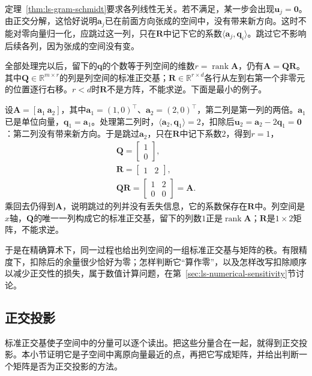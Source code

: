 定理~\ref{thm:ls-gram-schmidt}要求各列线性无关。若不满足，某一步会出现$\bm u_j=\bm0$。由正交分解，这恰好说明$\bm a_j$已在前面方向张成的空间中，没有带来新方向。这时不能对零向量归一化，应跳过这一列，只在$\bm R$中记下它的系数$\langle\bm a_j,\bm q_i\rangle$。跳过它不影响后续各列，因为张成的空间没有变。

全部处理完以后，留下的$\bm q$的个数等于列空间的维数$r=\operatorname{rank}\bm A$，仍有$\bm A=\bm Q\bm R$。其中$\bm Q\in\mathbb R^{m\times r}$的列是列空间的标准正交基；$\bm R\in\mathbb R^{r\times d}$各行从左到右第一个非零元的位置逐行右移。$r<d$时$\bm R$不是方阵，不能求逆。下面是最小的例子。
\begin{example}[列相关时跳过零余量]
\label{ex:ls-qr-dependent-columns}
设$\bm A=[\bm a_1\ \bm a_2]$，其中$\bm a_1=(1,0)^\top$、$\bm a_2=(2,0)^\top$，第二列是第一列的两倍。$\bm a_1$已是单位向量，$\bm q_1=\bm a_1$。处理第二列时，$\langle\bm a_2,\bm q_1\rangle=2$，扣除后$\bm u_2=\bm a_2-2\bm q_1=\bm0$：第二列没有带来新方向。于是跳过$\bm a_2$，只在$\bm R$中记下系数$2$，得到$r=1$，
\[
\begin{gathered}
\bm Q=\begin{bmatrix}1\\0\end{bmatrix},\\
\bm R=\begin{bmatrix}1&2\end{bmatrix},\\
\bm Q\bm R=\begin{bmatrix}1&2\\0&0\end{bmatrix}=\bm A .
\end{gathered}
\]
乘回去仍得到$\bm A$，说明跳过的列并没有丢失信息，它的系数保存在$\bm R$中。列空间是$x$轴，$\bm Q$的唯一一列构成它的标准正交基，留下的列数$1$正是$\operatorname{rank}\bm A$；$\bm R$是$1\times2$矩阵，不能求逆。
\end{example}
于是在精确算术下，同一过程也给出列空间的一组标准正交基与矩阵的秩。有限精度下，扣除后的余量很少恰好为零；怎样判断它“算作零”，以及怎样改写扣除顺序以减少正交性的损失，属于数值计算问题，在第~\ref{sec:ls-numerical-sensitivity}节讨论。

\subsection{正交投影}
\label{sec:ls-orthogonal-projection}

标准正交基使子空间中的分量可以逐个读出。把这些分量合在一起，就得到正交投影。本小节证明它是子空间中离原向量最近的点，再把它写成矩阵，并给出判断一个矩阵是否为正交投影的方法。

